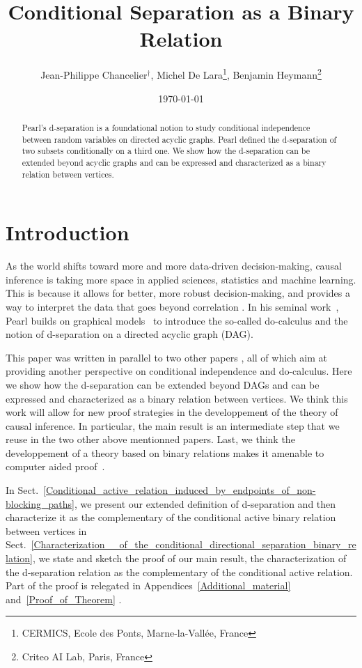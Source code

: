 \documentclass[12pt]{article}
\title{Conditional Separation as a Binary Relation}%
\author{%
  Jean-Philippe Chancelier$^\dagger$,
  Michel De Lara\footnote{CERMICS, Ecole des Ponts, Marne-la-Vall\'ee, France},
  Benjamin Heymann\footnote{Criteo AI Lab, Paris, France}
}
\date{\today}
\def\citep#1{\cite{#1}}
\newif\ifpreprint
\begin{document}
\maketitle

\begin{abstract}
  Pearl's d-separation is a foundational notion to study conditional
  independence between random variables on directed acyclic graphs.
  Pearl defined the d-separation of two subsets conditionally on a third one.
  We show how the d-separation can be extended beyond acyclic graphs
  and can be expressed and characterized as a binary relation between vertices. 
\end{abstract}

\setcounter{tocdepth}{2}
\pagebreak\tableofcontents \pagebreak 

\section{Introduction}
As the world shifts toward more and more data-driven decision-making, causal
inference is taking more space in applied sciences, statistics and machine
learning.  This is because it allows for better, more robust decision-making,
and provides a way to interpret the data that goes beyond correlation
\citep{pearl2018book}.  In his seminal work~\citep{pearl1995causal}, Pearl
builds on graphical models~\citep{cowell2006probabilistic} to introduce the
so-called do-calculus and the notion of d-separation on a directed acyclic graph
(DAG).

This paper was written in parallel to two other papers
\citep{De-Lara-Chancelier-Heymann-2021,Heymann-De-Lara-Chancelier-2021}, all of
which aim at providing another perspective on conditional independence and
do-calculus.  Here we show how the d-separation can be extended beyond DAGs and
can be expressed and characterized as a binary relation between vertices.  We
think this work will allow for new proof strategies in the developpement of the
theory of causal inference.  In particular, the main result is an intermediate
step that we reuse in the two other above mentionned papers.  Last, we think the
developpement of a theory based on binary relations makes it amenable to
computer aided proof~\citep{pous2013}. %

In Sect.~\ref{Conditional_active_relation_induced_by_endpoints_of_non-blocking_paths},
we present our extended definition of d-separation and then characterize it as
the complementary of the conditional active binary relation between vertices in
Sect.~\ref{Characterization__of_the_conditional_directional_separation_binary_relation},
we state and sketch the proof of our main result, the characterization of the
d-separation relation as the complementary of the conditional active relation.
Part of the proof is relegated in Appendices~\ref{Additional_material}
and~\ref{Proof_of_Theorem}%
\ifpreprint , as well as a treatment of the moral
  relation~\citep{Lauritzen-et-al-1990} with binary relations in
  Appendices~\ref{Moral_relation}.  \else .  \fi
\end{document}
